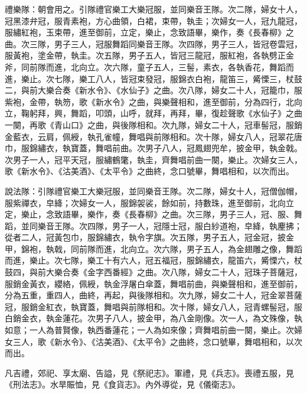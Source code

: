 \begin{pinyinscope}
 禮樂隊：朝會用之。引隊禮官樂工大樂冠服，並同樂音王隊。次二隊，婦女十人，冠黑漆弁冠，服青素袍，方心曲領，白裙，束帶，執圭；次婦女一人，冠九龍冠，服繡紅袍，玉束帶，進至御前，立定，樂止，念致語畢，樂作，奏《長春柳》之曲。次三隊，男子三人，冠服舞蹈同樂音王隊。次四隊，男子三人，皆冠卷雲冠，服黃袍，塗金帶，執圭。次五隊，男子五人，皆冠三龍冠，服紅袍，各執劈正金斧，同前隊而進，北向立。次六隊，童子五人，三髻，素衣，各執香花，舞蹈而進，樂止。次七隊，樂工八人，皆冠束發冠，服錦衣白袍，龍笛三，觱慄三，杖鼓二，與前大樂合奏《新水令》、《水仙子》之曲。次八隊，婦女二十人，冠籠巾，服紫袍，金帶，執笏，歌《新水令》之曲，與樂聲相和，進至御前，分為四行，北向立，鞠躬拜，興，舞蹈，叩頭，山呼，就拜，再拜，畢，復趁聲歌《水仙子》之曲一闋，再歌《青山口》之曲，與後隊相和。次九隊，婦女二十人，冠車髻冠，服銷金藍衣，云肩，佩綬，執孔雀幢，舞唱與前隊相和。次十隊，婦女八人，冠翠花唐巾，服錦繡衣，執寶蓋，舞唱前曲。次男子八人，冠鳳翅兜牟，披金甲，執金戟。次男子一人，冠平天冠，服繡鶴氅，執圭，齊舞唱前曲一闋，樂止。次婦女三人，歌《新水令》、《沽美酒》、《太平令》之曲終，念口號畢，舞唱相和，以次而出。



 說法隊：引隊禮官樂工大樂冠服，並同樂音王隊。次二隊，婦女十人，冠僧伽帽，服紫禪衣，皁絳；次婦女一人，服錦袈裟，餘如前，持數珠，進至御前，北向立定，樂止，念致語畢，樂作，奏《長春柳》之曲。次三隊，男子三人，冠、服、舞蹈，並同樂音王隊。次四隊，男子一人，冠隱士冠，服白紗道袍，皁絳，執麈拂；從者二人，冠黃包巾，服錦繡衣，執令字旗。次五隊，男子五人，冠金冠，披金甲，錦袍，執戟，同前隊而進，北向立。次六隊，男子五人，為金翅雕之像，舞蹈而進，樂止。次七隊，樂工十有六人，冠五福冠，服錦繡衣，龍笛六，觱慄六，杖鼓四，與前大樂合奏《金字西番經》之曲。次八隊，婦女二十人，冠珠子菩薩冠，服銷金黃衣，纓絡，佩綬，執金浮屠白傘蓋，舞唱前曲，與樂聲相和，進至御前，分為五重，重四人，曲終，再起，與後隊相和。次九隊，婦女二十人，冠金翠菩薩冠，服銷金紅衣，執寶蓋，舞唱與前隊相和。次十隊，婦女八人，冠青螺髻冠，服白銷金衣，執金蓮花。次男子八人，披金甲，為八金剛像。次一人，為文殊像，執如意；一人為普賢像，執西番蓮花；一人為如來像；齊舞唱前曲一闋，樂止。次婦女三人，歌《新水令》、《沽美酒》、《太平令》之曲終，念口號畢，舞唱相和，以次而出。



 凡吉禮，郊祀、享太廟、告謚，見《祭祀志》。軍禮，見《兵志》。喪禮五服，見《刑法志》。水旱賑恤，見《食貨志》。內外導從，見《儀衛志》。



\end{pinyinscope}